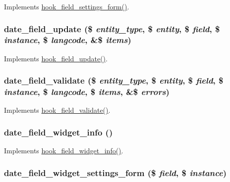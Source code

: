 \label{date_8field_8inc_a5f070593dfcf73a90c953b2402e0739b}
Implements \hyperlink{group__field__types_gab8a2ed808857cc6f3cb661fbc99d30d4}{hook\_\-field\_\-settings\_\-form()}. \hypertarget{date_8field_8inc_a655f21522e69937fc4b8c8de19e395cf}{
\subsubsection[{date\_\-field\_\-update}]{\setlength{\rightskip}{0pt plus 5cm}date\_\-field\_\-update (\$ {\em entity\_\-type}, \/  \$ {\em entity}, \/  \$ {\em field}, \/  \$ {\em instance}, \/  \$ {\em langcode}, \/  \&\$ {\em items})}}
\label{date_8field_8inc_a655f21522e69937fc4b8c8de19e395cf}
Implements \hyperlink{group__field__types_gaca5bc4f8ab69818f23783af24454d9c4}{hook\_\-field\_\-update()}. \hypertarget{date_8field_8inc_a0baf20c5214880496741eef3da69de79}{
\subsubsection[{date\_\-field\_\-validate}]{\setlength{\rightskip}{0pt plus 5cm}date\_\-field\_\-validate (\$ {\em entity\_\-type}, \/  \$ {\em entity}, \/  \$ {\em field}, \/  \$ {\em instance}, \/  \$ {\em langcode}, \/  \$ {\em items}, \/  \&\$ {\em errors})}}
\label{date_8field_8inc_a0baf20c5214880496741eef3da69de79}
Implements \hyperlink{group__field__types_gaa7d8846e8fe3766e1b3435cd50b965be}{hook\_\-field\_\-validate()}. \hypertarget{date_8field_8inc_a3985450d827612cb9e9c78297fa90cc7}{
\subsubsection[{date\_\-field\_\-widget\_\-info}]{\setlength{\rightskip}{0pt plus 5cm}date\_\-field\_\-widget\_\-info ()}}
\label{date_8field_8inc_a3985450d827612cb9e9c78297fa90cc7}
Implements \hyperlink{group__field__widget_gac53aa6c2a4ac1215660d25b5d7f20792}{hook\_\-field\_\-widget\_\-info()}. \hypertarget{date_8field_8inc_aacfb6134f4d15984d676313004bc7939}{
\subsubsection[{date\_\-field\_\-widget\_\-settings\_\-form}]{\setlength{\rightskip}{0pt plus 5cm}date\_\-field\_\-widget\_\-settings\_\-form (\$ {\em field}, \/  \$ {\em instance})}}
